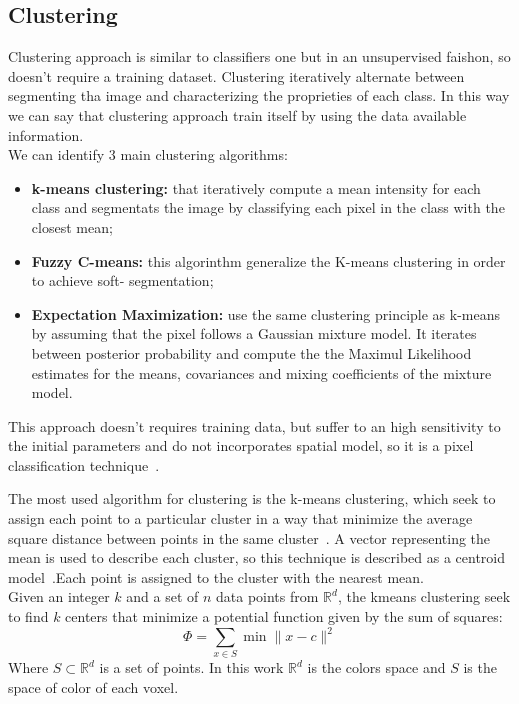\documentclass{standalone}
\begin{document}
	\subsection{Clustering}

		Clustering approach is similar to classifiers one but in an unsupervised faishon, so doesn't require a training dataset.
		Clustering iteratively alternate between segmenting tha image and characterizing the  proprieties of each class. In this way we can say that clustering approach train itself by using the data available information.\\
		We can identify 3 main clustering algorithms: 
		\begin{itemize}
	
			\item \textbf{k-means clustering: } that iteratively compute a mean intensity for each class and segmentats the image by classifying each pixel in the class with the closest mean;
	
			\item \textbf{Fuzzy C-means: } this algorinthm generalize the K-means clustering in order to achieve soft- segmentation;
		
			\item \textbf{Expectation Maximization:} use the same clustering principle as k-means by assuming that the pixel follows a Gaussian mixture model. It iterates between posterior probability and compute the the Maximul Likelihood estimates for the means, covariances and mixing coefficients of the mixture model. 
	
		\end{itemize}

		This approach doesn't requires training data, but suffer to an high sensitivity to the initial parameters and do not incorporates spatial model, so it is a pixel classification technique~\cite{ART:Pham}. 
		
		
		The most used algorithm for clustering is the k-means clustering, which seek to assign each point to a particular cluster in a way that minimize the average square distance between points in the same cluster~\cite{Arthur2007}. A vector representing the mean is used to describe each cluster, so this technique is described as a centroid model~\cite{ART:Morisette}.Each point is assigned to the cluster with the nearest mean.\\
		
		Given an integer $k$ and a set of $n$ data points from $\mathbb{R}^d$, the kmeans clustering seek to find $k$ centers that minimize a potential function given by the sum of squares: 
		\begin{equation}
			\Phi = \sum_{x\in S}\min\| x - c\|^2
		\end{equation} 
		Where $S\subset \mathbb R^d$ is a set of points. In this work $\mathbb{R}^d$ is the colors space and $S$ is the space of color of each voxel.
		
\end{document}

